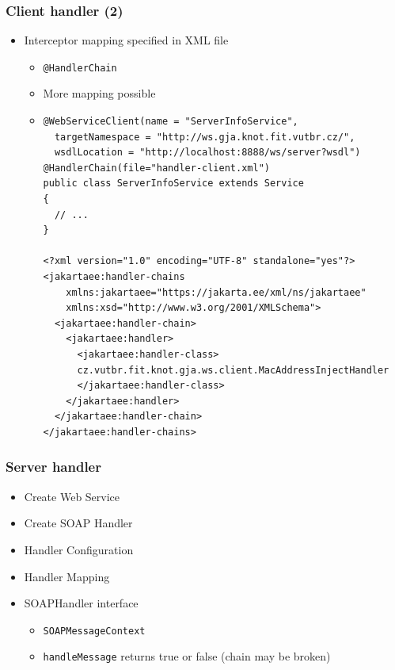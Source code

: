 \documentclass[10pt,xcolor=pdflatex]{beamer}
\begin{document}
\begin{frame}[containsverbatim]\frametitle{Client handler (2)}
\begin{itemize}
    \item Interceptor mapping specified in XML file	
    \begin{itemize}
    	\item \texttt{@HandlerChain}
		\item More mapping possible
        \item[] \begin{footnotesize}
      \begin{verbatim}
@WebServiceClient(name = "ServerInfoService",
  targetNamespace = "http://ws.gja.knot.fit.vutbr.cz/",
  wsdlLocation = "http://localhost:8888/ws/server?wsdl")
@HandlerChain(file="handler-client.xml")
public class ServerInfoService extends Service
{
  // ...
}
      
<?xml version="1.0" encoding="UTF-8" standalone="yes"?>
<jakartaee:handler-chains
    xmlns:jakartaee="https://jakarta.ee/xml/ns/jakartaee"
    xmlns:xsd="http://www.w3.org/2001/XMLSchema">
  <jakartaee:handler-chain>
    <jakartaee:handler>
      <jakartaee:handler-class>
      cz.vutbr.fit.knot.gja.ws.client.MacAddressInjectHandler
      </jakartaee:handler-class>
    </jakartaee:handler>
  </jakartaee:handler-chain>
</jakartaee:handler-chains>
\end{verbatim}
    \end{footnotesize}
    \end{itemize}   
\end{itemize}
\end{frame}


\begin{frame}[containsverbatim]\frametitle{Server handler}
\begin{itemize}
	\item Create Web Service
	\item Create SOAP Handler
	\item Handler Configuration
	\item Handler Mapping
	\item SOAPHandler interface
      \begin{itemize}
    	\item \texttt{SOAPMessageContext}
		\item \texttt{handleMessage} returns true or false (chain may be broken)
      \end{itemize}
\end{itemize}
\end{frame}
\end{document}
